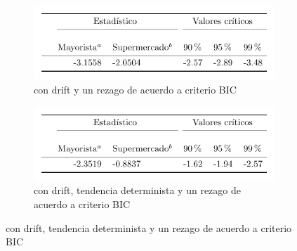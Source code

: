 \documentclass[border=3mm,preview]{standalone}
\numberwithin{equation}{section}
\begin{document}
\centering
\begin{varwidth}{\linewidth}
\begin{figure}
\begin{subfigure}{\textwidth}
\includegraphics{ers_11.pdf} 
\caption{con drift y un rezago de acuerdo a criterio BIC}
\end{subfigure}
\begin{subfigure}{\textwidth}
\includegraphics{ers_12.pdf}
\caption{con drift, tendencia determinista y un rezago de acuerdo a criterio BIC}
\end{subfigure}
\end{figure}
\end{varwidth}
\end{document}
